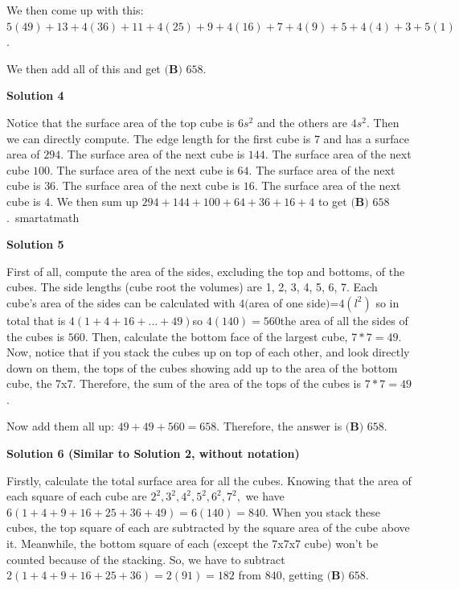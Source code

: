 \begin{enumerate}
 We then come up with this: $5(49)+13+4(36)+11+4(25)+9+4(16)+7+4(9)+5+4(4)+3+5(1)$. 

 We then add all of this and get $\boxed{\textbf{(B) }658}$.

 



\textbf{Solution 4}

Notice that the surface area of the top cube is $6s^2$ and the others are $4s^2$. Then we can directly compute. The edge length for the first cube is $7$ and has a surface area of $294$. The surface area of the next cube is $144$. The surface area of the next cube $100$. The surface area of the next cube is $64$. The surface area of the next cube is $36$. The surface area of the next cube is $16$. The surface area of the next cube is $4$. We then sum up $294+144+100+64+36+16+4$ to get $\boxed{\textbf{(B) }658}$.~smartatmath

 



\textbf{Solution 5}

First of all, compute the area of the sides, excluding the top and bottoms, of the cubes. The side lengths (cube root the volumes) are 1, 2, 3, 4, 5, 6, 7. Each cube's area of the sides can be calculated with $4($area of one side$)$=$4(l^2)$ so in total that is $4(1+4+16+...+49)$so $4(140)=560$the area of all the sides of the cubes is $560$. Then, calculate the bottom face of the largest cube, $7*7=49$. Now, notice that if you stack the cubes up on top of each other, and look directly down on them, the tops of the cubes showing add up to the area of the bottom cube, the 7x7. Therefore, the sum of the area of the tops of the cubes is $7*7=49$. 

 Now add them all up: $49+49+560=658.$ Therefore, the answer is $\boxed{\textbf{(B) }658}$. 

 



\textbf{Solution 6 (Similar to Solution 2, without notation)}

Firstly, calculate the total surface area for all the cubes. Knowing that the area of each square of each cube are $2^2,3^2,4^2,5^2,6^2,7^2,$ we have $6(1+4+9+16+25+36+49)=6(140)=840.$ When you stack these cubes, the top square of each are subtracted by the square area of the cube above it. Meanwhile, the bottom square of each (except the 7x7x7 cube) won't be counted because of the stacking. So, we have to subtract $2(1+4+9+16+25+36)=2(91)=182$ from $840$, getting $\boxed{\textbf{(B) }658}.$





\end{enumerate}
